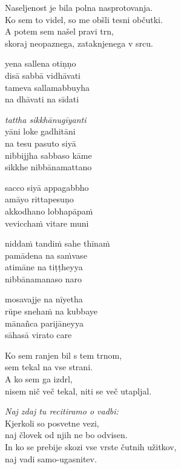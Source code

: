 Naseljenost je bila polna nasprotovanja.\\
Ko sem to videl, so me obšli tesni občutki.\\
A potem sem našel pravi trn,\\
skoraj neopaznega, zataknjenega v srcu.


\clearpage

yena sallena otiṇṇo\\
disā sabbā vidhāvati\\
tameva sallamabbuyha\\
na dhāvati na sīdati

\emph{tattha sikkhānugīyanti}\\
yāni loke gadhitāni\\
na tesu pasuto siyā\\
nibbijjha sabbaso kāme\\
sikkhe nibbānamattano

sacco siyā appagabbho\\
amāyo rittapesuṇo\\
akkodhano lobhapāpaṁ\\
vevicchaṁ vitare muni

niddaṁ tandiṁ sahe thīnaṁ\\
pamādena na saṁvase\\
atimāne na tiṭṭheyya\\
nibbānamanaso naro

mosavajje na nīyetha\\
rūpe snehaṁ na kubbaye\\
mānañca parijāneyya\\
sāhasā virato care


\clearpage

Ko sem ranjen bil s tem trnom,\\
sem tekal na vse strani.\\
A ko sem ga izdrl,\\
nisem nič več tekal, niti se več utapljal.

\emph{Naj zdaj tu recitiramo o vadbi:}\\
Kjerkoli so posvetne vezi,\\
naj človek od njih ne bo odvisen.\\
In ko se prebije skozi vse vrste čutnih užitkov,\\
naj vadi samo-ugasnitev.

